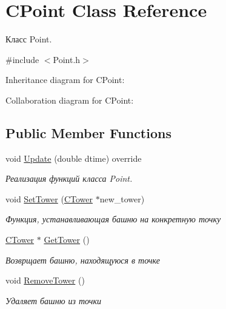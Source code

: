 \hypertarget{classCPoint}{}\section{C\+Point Class Reference}
\label{classCPoint}


Класс Point.  




{\ttfamily \#include $<$Point.\+h$>$}



Inheritance diagram for C\+Point\+:


Collaboration diagram for C\+Point\+:
\subsection*{Public Member Functions}
\begin{DoxyCompactItemize}
\item 
void \hyperlink{classCPoint_a9be3f2b4e3445a55ab8af9fd835a1c97}{Update} (double dtime) override\hypertarget{classCPoint_a9be3f2b4e3445a55ab8af9fd835a1c97}{}\label{classCPoint_a9be3f2b4e3445a55ab8af9fd835a1c97}

\begin{DoxyCompactList}\small\item\em Реализация функций класса Point. \end{DoxyCompactList}\item 
void \hyperlink{classCPoint_affd5dbce19225ab2d0c16bee32b6f319}{Set\+Tower} (\hyperlink{classCTower}{C\+Tower} $\ast$new\+\_\+tower)
\begin{DoxyCompactList}\small\item\em Функция, устанавливающая башню на конкретную точку \end{DoxyCompactList}\item 
\hyperlink{classCTower}{C\+Tower} $\ast$ \hyperlink{classCPoint_af7771884201912fbeed7dabb620aed5b}{Get\+Tower} ()
\begin{DoxyCompactList}\small\item\em Возврщает башню, находящуюся в точке \end{DoxyCompactList}\item 
void \hyperlink{classCPoint_a51dd2826fa96a4f9accac7bf3ab16eed}{Remove\+Tower} ()\hypertarget{classCPoint_a51dd2826fa96a4f9accac7bf3ab16eed}{}\label{classCPoint_a51dd2826fa96a4f9accac7bf3ab16eed}

\begin{DoxyCompactList}\small\item\em Удаляет башню из точки \end{DoxyCompactList}\end{DoxyCompactItemize}
